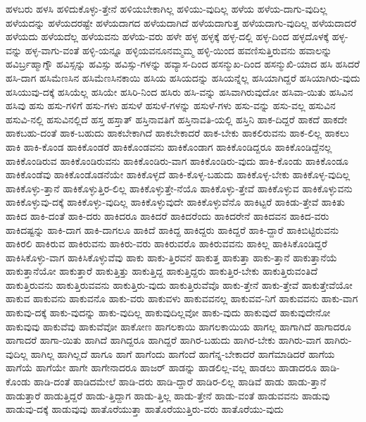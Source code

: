 {ಹಳಬರು
ಹಳಸಿ
ಹಳಿದುಕೊಳ್ಳು-ತ್ತೇನೆ
ಹಳಿಯಬೇಕಾಗಿಲ್ಲ
ಹಳಿಯು-ವುದಿಲ್ಲ
ಹಳೆಯ
ಹಳೆಯ-ದಾಗು-ವುದಿಲ್ಲ
ಹಳೆಯದನ್ನು
ಹಳೆಯದರಷ್ಟೇ
ಹಳೆಯದಾಗದ
ಹಳೆಯದಾಗಿದೆ
ಹಳೆಯದಾಗುತ್ತ
ಹಳೆಯದಾಗು-ವುದಿಲ್ಲ
ಹಳೆಯದಾದರೆ
ಹಳೆಯದು
ಹಳೆಯದೆಲ್ಲ
ಹಳೆಯವನು
ಹಳೆಯ-ವರು
ಹಳೇ
ಹಳ್ಳ
ಹಳ್ಳಕ್ಕೆ
ಹಳ್ಳ-ದಲ್ಲಿ
ಹಳ್ಳ-ದಿಂದ
ಹಳ್ಳದೊಳಕ್ಕೆ
ಹಳ್ಳ-ವನ್ನು
ಹಳ್ಳ-ವಾಗು-ವಂತೆ
ಹಳ್ಳಿ-ಯನ್ನೂ
ಹಳ್ಳಿಯವನೂನಮ್ಮಮ್ಮ
ಹಳ್ಳಿ-ಯಿಂದ
ಹವಣಿಸುತ್ತಿರುವನು
ಹವಾಲನ್ನು
ಹವಿರ್ಬ್ರಹ್ಮಾಗ್ನೌ
ಹವಿಸ್ಸನ್ನು
ಹವಿಸ್ಸು
ಹವಿಸ್ಸು-ಗಳನ್ನು
ಹವ್ಯಾಸ-ದಿಂದ
ಹಸನ್ಮುಖ-ದಿಂದ
ಹಸನ್ಮುಖಿ-ಯಾದ
ಹಸಿ
ಹಸಿದರೆ
ಹಸಿ-ದಾಗ
ಹಸಿಮೆಣಸಿನ
ಹಸಿಮೆಣಸಿನಕಾಯಿ
ಹಸಿಯ
ಹಸಿಯದನ್ನು
ಹಸಿಯನ್ನೆಲ್ಲ
ಹಸಿಯಾಗಿದ್ದರೆ
ಹಸಿಯಾಗಿರು-ವುದು
ಹಸಿಯುವು-ದಕ್ಕೆ
ಹಸಿಯೆಲ್ಲ
ಹಸಿಯೇ
ಹಸಿರಿ-ನಿಂದ
ಹಸಿರು
ಹಸಿ-ವನ್ನು
ಹಸಿವಾಗಿರುವುದೋ
ಹಸಿವಾ-ಯಿತು
ಹಸಿವಿನ
ಹಸಿವು
ಹಸು
ಹಸು-ಗಳಿಗೆ
ಹಸು-ಗಳು
ಹಸುಳೆ
ಹಸುಳೆ-ಗಳನ್ನು
ಹಸುಳೆ-ಗಳು
ಹಸು-ವನ್ನು
ಹಸು-ವಲ್ಲ
ಹಸುವಿನ
ಹಸುವಿ-ನಲ್ಲಿ
ಹಸುವಿನಲ್ಲಿದೆ
ಹಸ್ತ
ಹಸ್ತಾತ್
ಹಸ್ತಿನಾವತಿಗೆ
ಹಸ್ತಿನಾವತಿ-ಯಲ್ಲಿ
ಹಸ್ತಿನಿ
ಹಾಕ-ದಿದ್ದರೆ
ಹಾಕದೆ
ಹಾಕದೇ
ಹಾಕಬಹು-ದಂತೆ
ಹಾಕ-ಬಹುದು
ಹಾಕಬೇಕಾಗಿದೆ
ಹಾಕಬೇಕಾದರೆ
ಹಾಕ-ಬೇಕು
ಹಾಕಲಿರುವನು
ಹಾಕ-ಲಿಲ್ಲ
ಹಾಕಲು
ಹಾಕಿ
ಹಾಕಿ-ಕೊಂಡ
ಹಾಕಿಕೊಂಡರೆ
ಹಾಕಿಕೊಂಡವನು
ಹಾಕಿಕೊಂಡಾಗ
ಹಾಕಿಕೊಂಡಿದ್ದರೂ
ಹಾಕಿಕೊಂಡಿದ್ದೆನಲ್ಲ
ಹಾಕಿಕೊಂಡಿರುವ
ಹಾಕಿಕೊಂಡಿರುವನು
ಹಾಕಿಕೊಂಡಿರು-ವಾಗ
ಹಾಕಿಕೊಂಡಿರು-ವುದು
ಹಾಕಿ-ಕೊಂಡು
ಹಾಕಿಕೊಂಡೂ
ಹಾಕಿಕೊಂಡೆವು
ಹಾಕಿಕೊಂಡೊಡನೆಯೇ
ಹಾಕಿಕೊಳ್ಳದೆ
ಹಾಕಿ-ಕೊಳ್ಳ-ಬಹುದು
ಹಾಕಿಕೊಳ್ಳ-ಬೇಕು
ಹಾಕಿಕೊಳ್ಳ-ವುದಿಲ್ಲ
ಹಾಕಿಕೊಳ್ಳು-ತ್ತಾನೆ
ಹಾಕಿಕೊಳ್ಳುತ್ತಿರ-ಲಿಲ್ಲ
ಹಾಕಿಕೊಳ್ಳುತ್ತೇ-ನೆಯೊ
ಹಾಕಿಕೊಳ್ಳು-ತ್ತೇವೆ
ಹಾಕಿಕೊಳ್ಳುವ
ಹಾಕಿಕೊಳ್ಳುವನು
ಹಾಕಿಕೊಳ್ಳುವು-ದಕ್ಕೆ
ಹಾಕಿಕೊಳ್ಳು-ವುದಿಲ್ಲ
ಹಾಕಿಕೊಳ್ಳುವುದೇ
ಹಾಕಿಕೊಳ್ಳುವೆನೊ
ಹಾಕಿಟ್ಟರೆ
ಹಾಕಿಡು-ತ್ತೇವೆ
ಹಾಕಿತು
ಹಾಕಿದ
ಹಾಕಿ-ದಂತೆ
ಹಾಕಿ-ದರು
ಹಾಕಿದರೂ
ಹಾಕಿದರೆ
ಹಾಕಿದರೆಂದು
ಹಾಕಿದರೇನೆ
ಹಾಕಿದವನ
ಹಾಕಿದ-ವರು
ಹಾಕಿದಷ್ಟನ್ನು
ಹಾಕಿ-ದಾಗ
ಹಾಕಿ-ದಾಗಲೂ
ಹಾಕಿದೆ
ಹಾಕಿದ್ದ
ಹಾಕಿದ್ದರು
ಹಾಕಿದ್ದರೆ
ಹಾಕಿ-ದ್ದಾರೆ
ಹಾಕಿಬಿಟ್ಟಿರುವನು
ಹಾಕಿರಲಿ
ಹಾಕಿರುವ
ಹಾಕಿರುವನು
ಹಾಕಿರು-ವರು
ಹಾಕಿರುವರೊ
ಹಾಕಿರುವವನು
ಹಾಕಿಲ್ಲ
ಹಾಕಿಸಿಕೊಂಡಿದ್ದರೆ
ಹಾಕಿಸಿಕೊಳ್ಳು-ವಾಗ
ಹಾಕಿಸಿಕೊಳ್ಳುವೆವು
ಹಾಕು
ಹಾಕು-ತ್ತಿರವನೆ
ಹಾಕುತ್ತ
ಹಾಕುತ್ತಾ
ಹಾಕು-ತ್ತಾನೆ
ಹಾಕುತ್ತಾನೆಯೆ
ಹಾಕುತ್ತಾನೆಯೋ
ಹಾಕುತ್ತಾರೆ
ಹಾಕುತ್ತಿತ್ತು
ಹಾಕುತ್ತಿದ್ದ
ಹಾಕುತ್ತಿದ್ದರು
ಹಾಕುತ್ತಿರ-ಬೇಕು
ಹಾಕುತ್ತಿರುವಂತಿದೆ
ಹಾಕುತ್ತಿರುವನು
ಹಾಕುತ್ತಿರುವವನು
ಹಾಕುತ್ತಿರು-ವುದು
ಹಾಕುತ್ತಿರುವೆವೊ
ಹಾಕು-ತ್ತೇನೆ
ಹಾಕು-ತ್ತೇವೆ
ಹಾಕುತ್ತೇವೆಯೋ
ಹಾಕುವ
ಹಾಕುವನು
ಹಾಕುವನೊ
ಹಾಕು-ವರು
ಹಾಕುವಳು
ಹಾಕುವವನಲ್ಲ
ಹಾಕುವವ-ನಿಗೆ
ಹಾಕುವವನು
ಹಾಕು-ವಾಗ
ಹಾಕುವು-ದಕ್ಕೆ
ಹಾಕು-ವುದನ್ನು
ಹಾಕು-ವುದಿಲ್ಲ
ಹಾಕುವುದಿಲ್ಲವೋ
ಹಾಕು-ವುದು
ಹಾಕುವುದೆ
ಹಾಕುವುದೇನೋ
ಹಾಕುವುವು
ಹಾಕುವೆವು
ಹಾಕುವೆವೋ
ಹಾಕೋಣ
ಹಾಗಲಕಾಯಿ
ಹಾಗಲಕಾಯಿಯ
ಹಾಗಲ್ಲ
ಹಾಗಾಗಿದೆ
ಹಾಗಾದರೂ
ಹಾಗಾದರೆ
ಹಾಗಾ-ಯಿತು
ಹಾಗಿದೆ
ಹಾಗಿದ್ದರೂ
ಹಾಗಿದ್ದರೆ
ಹಾಗಿರ-ಬಹುದು
ಹಾಗಿರ-ಬೇಕು
ಹಾಗಿರು-ವಾಗ
ಹಾಗಿರು-ವುದಿಲ್ಲ
ಹಾಗಿಲ್ಲ
ಹಾಗಿಲ್ಲದೆ
ಹಾಗೂ
ಹಾಗೆ
ಹಾಗೆಂದು
ಹಾಗೆಂದೆ
ಹಾಗೆನ್ನ-ಬೇಕಾದರೆ
ಹಾಗೆಮಾಡಿದರೆ
ಹಾಗೆಯ
ಹಾಗೆಯೆ
ಹಾಗೆಯೇ
ಹಾಗೇ
ಹಾಗೇನಾದರೂ
ಹಾಜರ್
ಹಾಡನ್ನು
ಹಾಡಲಿಲ್ಲ-ವಲ್ಲ
ಹಾಡಲು
ಹಾಡಾದರೂ
ಹಾಡಿ-ಕೊಂಡು
ಹಾಡಿ-ದಂತೆ
ಹಾಡಿದಮೇಲೆ
ಹಾಡಿ-ದರು
ಹಾಡಿ-ದ್ದಾರೆ
ಹಾಡಿರ-ಲಿಲ್ಲ
ಹಾಡಿವೆ
ಹಾಡು
ಹಾಡು-ತ್ತಾನೆ
ಹಾಡುತ್ತಾರೆ
ಹಾಡುತ್ತಿದ್ದರೆ
ಹಾಡು-ತ್ತಿದ್ದಾಗ
ಹಾಡು-ತ್ತಿಲ್ಲ
ಹಾಡು-ತ್ತೇನೆ
ಹಾಡು-ವಂತೆ
ಹಾಡುವವನು
ಹಾಡುವು
ಹಾಡುವು-ದಕ್ಕೆ
ಹಾಡುವುವು
ಹಾತೊರೆಯುತ್ತಾ
ಹಾತೊರೆಯುತ್ತಿರು-ವರು
ಹಾತೊರೆಯು-ವುದು
}
